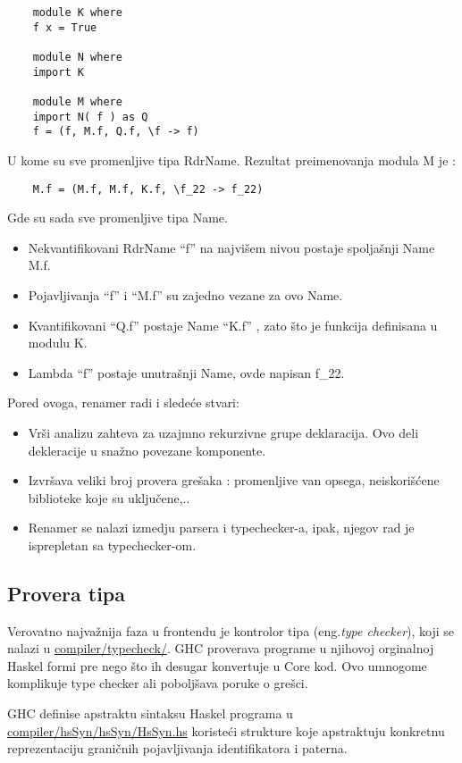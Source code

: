\begin{verbatim}
	module K where
	f x = True
	
	module N where
	import K
	
	module M where
	import N( f ) as Q
	f = (f, M.f, Q.f, \f -> f)
\end{verbatim}
U kome su sve promenljive tipa RdrName. Rezultat preimenovanja modula M je :
\begin{verbatim}
	M.f = (M.f, M.f, K.f, \f_22 -> f_22)
\end{verbatim} 
Gde su sada sve promenljive tipa Name.
\begin{itemize}
	\item Nekvantifikovani RdrName “f” na najvišem nivou postaje spoljašnji Name M.f.
	\item Pojavljivanja “f” i  “M.f” su zajedno vezane za ovo Name.
	\item  Kvantifikovani “Q.f” postaje Name “K.f” , zato što je funkcija definisana u modulu K.
	\item Lambda “f” postaje unutrašnji Name, ovde napisan f\_22.
\end{itemize}

Pored ovoga, renamer radi i sledeće stvari:
\begin{itemize}
	\item Vrši analizu zahteva za uzajmno rekurzivne grupe deklaracija. Ovo deli dekleracije u snažno povezane komponente.
	\item Izvršava veliki broj provera grešaka : promenljive van opsega, neiskorišćene biblioteke koje su uključene,..
	\item Renamer se nalazi izmedju parsera i typechecker-a, ipak, njegov rad je isprepletan sa typechecker-om.
\end{itemize}

\subsection{Provera tipa}
\label{subsec:podnaslovTypecheck}

Verovatno najvažnija faza u frontendu je kontrolor tipa (eng.\emph{type checker}), koji se nalazi u \underline{compiler/typecheck/}. GHC proverava  programe u njihovoj orginalnoj Haskel formi pre nego što ih desugar konvertuje u Core kod. Ovo umnogome komplikuje type checker ali poboljšava poruke o grešci.

GHC definise apstraktu sintaksu Haskel programa u \\ \underline{compiler/hsSyn/hsSyn/HsSyn.hs}  koristeći strukture koje apstraktuju konkretnu reprezentaciju graničnih pojavljivanja identifikatora i paterna.


